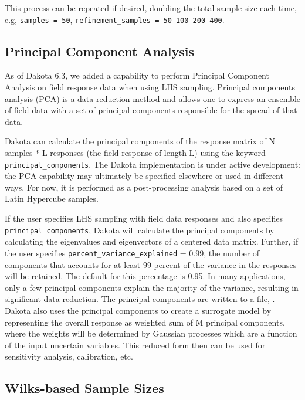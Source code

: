 \begin{enumerate}
  This process can be repeated if desired, doubling the total sample
  size each time, e.g, \texttt{samples = 50},
  \texttt{refinement\_samples = 50  100  200  400}.

\end{enumerate}

\subsection{Principal Component Analysis} 
As of Dakota 6.3, we added a capability to perform 
Principal Component Analysis on field response data when 
using LHS sampling.  Principal components analysis (PCA) 
is a data reduction method and allows one to express an 
ensemble of field data with a set of principal components 
responsible for the spread of that data.

Dakota can calculate the principal components of the response matrix of
N samples * L responses (the field response of length L) 
using the keyword \texttt{principal\_components}.
The Dakota implementation is under active development:  the PCA capability
may ultimately be specified elsewhere or used in different ways.
For now, it is performed as a post-processing analysis based on a set of 
Latin Hypercube samples.
 
If the user specifies LHS sampling with field data responses and also 
specifies \texttt{principal\_components}, Dakota will calculate the principal
components by calculating the eigenvalues and eigenvectors of a centered 
data matrix.   
Further, if the user specifies \texttt{percent\_variance\_explained} = 0.99, 
the number of components that accounts for at least 99 percent of the variance 
in the responses will be retained.  The default for this percentage is 0.95.  
In many applications, only a few principal components explain the majority 
of the variance, resulting in significant data reduction.
The principal components are written to a file, .
Dakota also uses the principal components to create a surrogate model by 
representing the overall response as weighted sum of M principal components, 
where the weights will be determined by Gaussian processes which are a function 
of the input uncertain variables.  This reduced form then can be used for 
sensitivity analysis, calibration, etc.  

\subsection{Wilks-based Sample Sizes}\label{uq:wilks}

